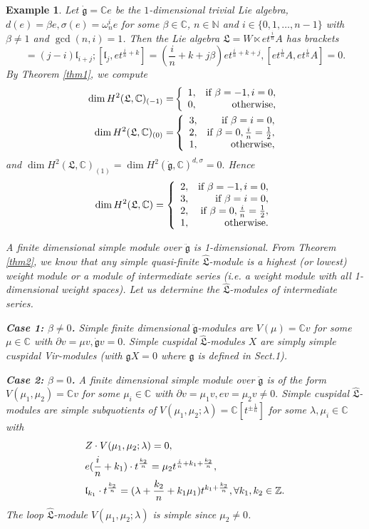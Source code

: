 \documentclass[1p]{elsarticle}
\numberwithin{equation}{section}
\def\dg{\dot{\mathfrak{g}}}
\def\ddg{\ddot{\mathfrak{g}}}
\def\fL{\mathfrak{L}}
\def\bC{\mathbb{C}}
\def\bN{\mathbb{N}}
\def\bZ{\mathbb{Z}}
\def\fl{\mathfrak{l}}
\def\hL{\hat{\fL}}
\newtheorem{exam}{Example}
\begin{document}
\begin{exam}\label{ex1} Let $\dg=\bC e$ be the  $1$-dimensional trivial  Lie algebra, $d(e)=\beta e, \sigma(e)=\omega_n^ie $ for some $\beta\in \bC$, $n\in \bN$ and $i\in \{0,1,\ldots,n-1\}$ with $\beta \ne 1$ and $\gcd(n,i)=1$. Then the Lie algebra $\fL=W\ltimes et^{\frac in}A$ has brackets
 \begin{equation}[\fl_i, \fl_j]=(j-i)\fl_{i+j}; [\fl_j,et^{\frac in+k}]=(\frac in+k+j\beta)et^{\frac in+k+j},[et^{\frac in}A,et^{\frac in}A]=0.\end{equation}
 By Theorem \ref{thm1}, we compute  
 $$\begin{aligned}\dim H^2(\fL,\bC)_{(-1)}=&\left\{\begin{array}{lr}1,& \text{\rm if }\beta=-1,i=0,\\0,& {\rm otherwise}, \end{array}\right.\\
 	\dim H^2(\fL,\bC)_{(0)}=&\left\{\begin{array}{lr}3,& \text{\rm if }\beta=i=0,\\ 2, &\text{\rm if }\beta=0,\frac in=\frac 12,\\ 1, &{\rm otherwise}, \end{array}\right.\end{aligned}$$ and $\dim H^2(\fL,\bC)_{(1)}=\dim H^2(\dg,\bC)^{d,\sigma}=0.$ 
 	Hence $$\dim H^2(\fL,\bC)=\left\{\begin{array}{lr}2,&\text{\rm if } \beta=-1,i=0, \\3,&\text{\rm if }\beta=i=0,\\ 2,&\text{\rm if }\beta=0,\frac in=\frac 12,\\1,& {\rm otherwise}. \end{array}\right.$$

A finite dimensional simple module  over $\ddg$ is 1-dimensional. From Theorem \ref{thm2}, we know that any simple quasi-finite $\hL$-module is a highest (or lowest) weight module or a module of intermediate series (i.e. a weight module with all 1-dimensional weight spaces). Let us determine the $\hL$-modules of intermediate series.



{\bf Case 1: $\beta\ne0$.} Simple finite dimensional $\ddg$-modules are $V(\mu)=\bC v$ for some $\mu\in\bC$ with $\partial v=\mu v, \dg v=0.$ Simple cuspidal $\hL$-modules $X$ are simply simple cuspidal Vir-modules (with $\mathfrak{g} X=0$ where $\mathfrak{g}$ is defined in Sect.1).

{\bf Case 2: $\beta=0$.} 
A finite dimensional simple module  over $\ddg$ is of the form  $V(\mu_1, \mu_2)=\bC v$ for some $\mu_i\in\bC$ with $\partial v=\mu_1 v,  e v= \mu_2 v\ne0.$ Simple cuspidal $\hL$-modules are simple subquotients of $V(\mu_1, \mu_2; \lambda)=\bC[t^{\pm \frac1n}]$ for some $\lambda,\mu_i\in\bC$  with  
$$\aligned &Z\cdot V(\mu_1, \mu_2; \lambda) =0, \\ &e(\frac {i}n+k_1)\cdot t^{\frac{k_2}{n}}=\mu_2t^{\frac {i}n+k_1+\frac{k_2}{n}},\\
&\fl_{k_1}\cdot t^{\frac{k_2}{n}}=(\lambda+\frac{k_2}{n}+k_1\mu_1)t^{ {k_1}+\frac{k_2}{n}}, \forall k_1,k_2\in\bZ.
\endaligned$$
The loop $\hL$-module $V(\mu_1, \mu_2; \lambda)$ is simple since $\mu_2\ne0$.



\end{exam}
\end{document}
